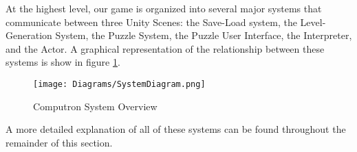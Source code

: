 At the highest level, our game is organized into several major systems that communicate between three Unity Scenes: the Save-Load system, the Level-Generation System, the Puzzle System, the Puzzle User Interface, the Interpreter, and the Actor. A graphical representation of the relationship between these systems is show in figure \ref{fig:overall_system_diagram}.

\begin{figure}[!hb]
    \caption{Computron System Overview}
    \label{fig:overall_system_diagram}
    \centering
    \texttt{[image: Diagrams/SystemDiagram.png]}
\end{figure}

A more detailed explanation of all of these systems can be found throughout the remainder of this section.